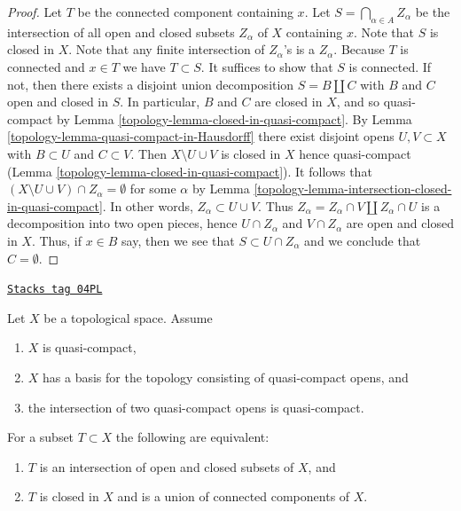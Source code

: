 \begin{proof}

Let $T$ be the connected component containing $x$.
Let $S = \bigcap_{\alpha \in A} Z_\alpha$ be the intersection of all
open and closed subsets $Z_\alpha$ of $X$ containing $x$.
Note that $S$ is closed in $X$.
Note that any finite intersection of $Z_\alpha$'s is a $Z_\alpha$.
Because $T$ is connected and $x \in T$ we have $T \subset S$.
It suffices to show that $S$ is connected.
If not, then there exists a disjoint union decomposition
$S = B \amalg C$ with $B$ and $C$ open and closed in $S$.
In particular, $B$ and $C$ are closed in $X$, and so quasi-compact by
Lemma \ref{topology-lemma-closed-in-quasi-compact}.
By Lemma \ref{topology-lemma-quasi-compact-in-Hausdorff}
there exist disjoint opens $U, V \subset X$ with $B \subset U$ and
$C \subset V$. Then $X \setminus U \cup V$ is closed in $X$
hence quasi-compact (Lemma \ref{topology-lemma-closed-in-quasi-compact}).
It follows that $(X \setminus U \cup V) \cap Z_\alpha = \emptyset$
for some $\alpha$ by Lemma \ref{topology-lemma-intersection-closed-in-quasi-compact}.
In other words, $Z_\alpha \subset U \cup V$. Thus
$Z_\alpha = Z_\alpha \cap V \amalg Z_\alpha \cap U$
is a decomposition into two open pieces,
hence $U \cap Z_\alpha$ and $V \cap Z_\alpha$ are open and closed in $X$.
Thus, if $x \in B$ say, then we see that $S \subset U \cap Z_\alpha$
and we conclude that $C = \emptyset$.
\end{proof}

\begin{lemma}
\label{topology-lemma-closed-union-connected-components}
\href{https://stacks.math.columbia.edu/tag/04PL}{\texttt{Stacks tag 04PL}}

Let $X$ be a topological space.
Assume
\begin{enumerate}
\item $X$ is quasi-compact,
\item $X$ has a basis for the topology consisting of quasi-compact opens, and
\item the intersection of two quasi-compact opens is quasi-compact.
\end{enumerate}
For a subset $T \subset X$ the following are equivalent:
\begin{enumerate}
\item[(a)] $T$ is an intersection of open and closed subsets of $X$, and
\item[(b)] $T$ is closed in $X$ and is a union of connected components of $X$.
\end{enumerate}
\end{lemma}

